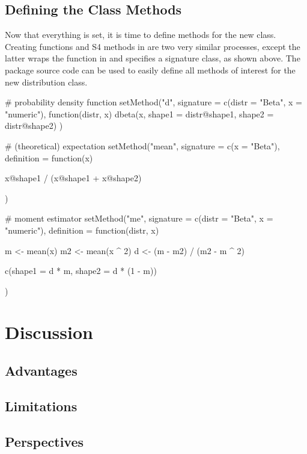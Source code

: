 \documentclass[nojss]{jss}
\newcommand{\fct}[1]{\code{#1()}}
\begin{document}
\subsection[Defining the Class Methods]{Defining the Class Methods}

Now that everything is set, it is time to define methods for the new class. Creating functions and S4 methods in  are two very similar processes, except the latter wraps the function in \fct{setMethod} and specifies a signature class, as shown above. The package source code can be used to easily define all methods of interest for the new distribution class.

\begin{CodeChunk}
\begin{CodeInput}
# probability density function
setMethod("d", signature = c(distr = "Beta", x = "numeric"),
          function(distr, x) {
            dbeta(x, shape1 = distr@shape1, shape2 = distr@shape2)
          })

# (theoretical) expectation
setMethod("mean",
          signature  = c(x = "Beta"),
          definition = function(x) {

  x@shape1 / (x@shape1 + x@shape2)

})

# moment estimator
setMethod("me",
          signature  = c(distr = "Beta", x = "numeric"),
          definition = function(distr, x) {

  m  <- mean(x)
  m2 <- mean(x ^ 2)
  d  <- (m - m2) / (m2 - m ^ 2)

  c(shape1 = d * m, shape2 = d * (1 - m))

})
\end{CodeInput}
\end{CodeChunk}

\section[Discussion]{Discussion}

\subsection[Advantages]{Advantages}

\subsection[Limitations]{Limitations}

\subsection[Perspectives]{Perspectives}
\end{document}
